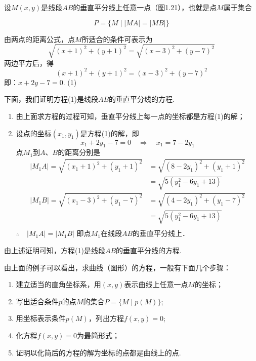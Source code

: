 \begin{solution}
    设$M(x,y)$是线段$AB$的垂直平分线上任意一点（图1.21），也就是点$M$属于集合

    \noindent
\begin{minipage}{.6\textwidth}
\CTEXindent    \[P=\{M\mid |MA|=|MB|\}\]

由两点的距离公式，点$M$所适合的条件可表示为
\[\sqrt{(x+1)^2+(y+1)^2}=\sqrt{(x-3)^2+(y-7)^2}\]
两边平方后，得
\[(x+1)^2+(y+1)^2=(x-3)^2+(y-7)^2\]
即：$x+2y-7=0$. \hfill (1)

下面，我们证明方程(1)是线段$AB$的垂直平分线的方程.    
\end{minipage}\hfill
\begin{minipage}{.35\textwidth}
\centering
{}
\end{minipage}

\begin{enumerate}[(1)]
\item 由上面求方程的过程可知，垂直平分线上每一点的坐标都是方程(1)的解；
\item 设点的坐标$(x_1,y_1)$是方程(1)的解，即
\[x_1+2y_1-7=0 \quad \Rightarrow\quad x_1=7-2y_1\]
点$M_1$到$A$、$B$的距离分别是
\[\begin{split}
|M_1A|=\sqrt{(x_1+1)^2+(y_1+1)^2}&=\sqrt{(8-2y_1)^2+(y_1+1)^2}\\
&=\sqrt{5(y^2_1-6y_1+13)}\\
|M_1B|=\sqrt{(x_1-3)^2+(y_1-7)^2}&=\sqrt{(4-2y_1)^2+(y_1-7)^2}\\
&=\sqrt{5(y^2_1-6y_1+13)}\\
\end{split}\]
$\therefore\quad |M_1A|=|M_1B|$
即点$M_1$在线段$AB$的垂直平分线上．
\end{enumerate}
\end{solution}

由上述证明可知，方程(1)是线段$AB$的垂直平分线的方程.

由上面的例子可以看出，求曲线（图形）的方程，一般有下面几个步骤：
\begin{enumerate}[(1)]
\item 建立适当的直角坐标系，用$(x,y)$表示曲线上任意一点$M$的坐标；
\item 写出适合条件$p$的点$M$的集合$P=\{M\mid p(M)\}$;
\item 用坐标表示条件$p(M)$，列出方程$f(x,y)=0$;
\item 化方程$f(x,y)=0$为最简形式；
\item 证明以化简后的方程的解为坐标的点都是曲线上的点.
\end{enumerate}


